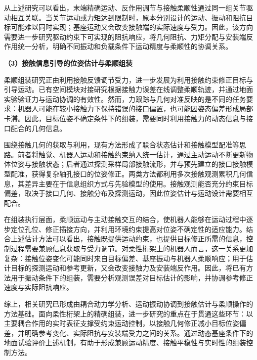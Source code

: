 \documentclass[UTF8,a4paper,zihao=-4,fontset=fandol]{ctexart}
\newcommand{\topic}[1]{\par\addvspace{0.5em}\noindent\textbf{#1}\par\nobreak}
\begin{document}
从上述研究可以看出，末端精确运动、反作用调节与接触柔顺性通过同一组关节驱动相互关联。当关节运动或力矩达到限制时，原本分别设计的运动、振动和阻抗目标可能难以同时实现；基座运动又会改变接触端的实际速度与受力。因此，该方向需要进一步研究驱动约束下可实现的阻抗响应，将几何阻抗、力矩分配与安装端反作用统一分析，明确不同振动和负载条件下运动精度与柔顺性的协调关系。

\topic{（3）接触信息引导的位姿估计与柔顺组装}

柔顺组装研究正由利用接触反馈调节受力，进一步发展为利用接触约束修正目标与引导运动。已有空间模块对接研究根据接触力误差在线调整柔顺轨迹，并通过地面实验验证力与运动协调的有效性\cite{shi2024}。然而，力跟踪与几何对准反映的是不同的任务要求：机器人可能在较小接触力下保持错误的接口偏置，也可能因姿态偏差形成局部卡滞。因此，目标位姿不确定条件下的组装，需要同时利用接触力的动态信息与接口配合的几何信息。

围绕接触几何的获取与利用，现有方法形成了联合状态估计和接触模型配准等思路。前者将触觉、机器人运动和接触约束纳入统一估计，通过主动运动不断更新物体位姿与接触状态\cite{kimtactile2023}；后者通过探测采样局部接触流形，并与预先建立的接口接触模型配准，获得复杂轴孔接口的位姿修正\cite{negi2025}。两类方法都利用多次接触观测累积几何信息，其差异主要在于信息组织方式与先验模型的使用。接触观测能否充分约束目标偏差，取决于接口几何、接触分布及探测运动，因此位姿估计与运动设计需要相互配合。

在组装执行层面，柔顺运动与主动接触交互的结合，使机器人能够在运动过程中逐步定位孔位、修正插接方向，并利用环境约束提高对位姿不确定性的适应能力\cite{chen2025}。结合上述估计方法可以看出，接触既提供运动约束，也提供目标修正所需的信息，控制过程需要兼顾信息获取与受力调节。对柔性桁架上的机器人而言，这一关系更加复杂：接触位姿变化可能同时来自目标偏差、基座振动与机器人柔顺响应；用于估计目标的探测运动和参考更新，又会改变接触力及安装端反作用。因此，将已有方法用于振动条件下的组装，需要分析观测误差对目标估计的影响，并协调参考修正速度与实际阻抗响应。

综上，相关研究已形成由耦合动力学分析、运动振动协调到接触估计与柔顺操作的方法基础。面向柔性桁架上的精确组装，进一步研究的重点在于贯通这些环节：以主要耦合作用的实时表征支撑受约束运动控制，以接触几何修正减小目标位姿偏差，并明确参考变化、实际阻抗与安装端受力之间的关系。通过动态基座条件下的地面试验评价上述机制，有助于形成兼顾运动精度、接触平稳性与实时性的组装控制方法。


\begingroup
\small
{}
\setlength{\parskip}{0pt}
\end{document}
